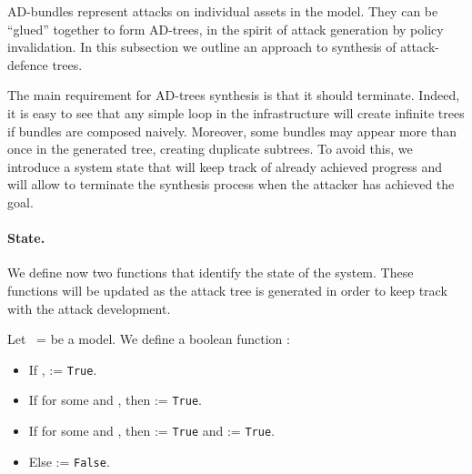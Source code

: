 \documentclass{llncs}
\begin{document}
AD-bundles represent attacks on individual assets in the model. They can be ``glued'' together to form AD-trees, in the spirit of attack generation by policy invalidation. In this subsection we outline an approach to synthesis of attack-defence trees.

The main requirement for AD-trees synthesis is that it should terminate. Indeed, it is easy to see that any simple loop in the infrastructure will create infinite trees if bundles are composed naively. Moreover, some bundles may appear more than once in the generated tree, creating duplicate subtrees. To avoid this, we introduce a system state that will keep track of already achieved progress and will allow to terminate the synthesis process when the attacker has achieved the goal. 



\paragraph{State.}
We define now two functions that identify the state of the system. These functions will be updated as the attack tree is generated in order to keep track with the attack development.

\iffalse{
We define a boolean function \Posesses{}{}    :
\begin{itemize}
\item If , and  \Posesses{a}{o} := \texttt{True}.
\item If for some  , and \Posesses{a}{o_2} = \texttt{True}, then \Posesses{a}{o_1} := \texttt{True}.
\item Else \Posesses{a}{n} = \texttt{False}.	
\end{itemize}
Intuitively, the function \Posesses{}{} refers to objects that an actor has.
}\fi

\begin{definition}[\Reachable{}{}]	
Let \model\ =  be a model. We define a boolean function \Reachable{}{}    :
\begin{itemize}
\item If ,  := \texttt{True}.
\item If for some   and , then  := \texttt{True}. 
\item If for some   and , then  := \texttt{True} and  := \texttt{True}. 

\item Else  := \texttt{False}.	
\end{itemize}
\end{definition}
\end{document}
